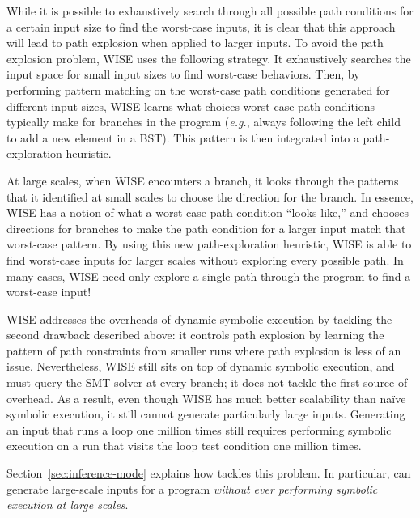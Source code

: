 While it is possible to exhaustively search through all possible path conditions for a certain input size to find the worst-case inputs, it is clear that this approach will lead
to path explosion when applied to larger inputs. To avoid the path explosion
problem, WISE uses the following strategy. It exhaustively searches the
input space for small input sizes to find worst-case behaviors. Then, by
performing pattern matching on the worst-case path conditions generated
for different input sizes, WISE learns what choices worst-case path conditions typically make for branches in the program ({\em e.g.}, always following the
left child to add a new element in a BST). This pattern is then integrated
into a path-exploration heuristic.

At large scales, when WISE encounters a branch, it looks through the
patterns that it identified at small scales to choose the direction for the
branch. In essence, WISE has a notion of what a worst-case path condition
``looks like,'' and chooses directions for branches to make the path condition
for a larger input match that worst-case pattern. By using this new
path-exploration heuristic, WISE is able to find worst-case inputs for larger
scales without exploring every possible path. In many cases, WISE need only
explore a single path through the program to find a worst-case input!

WISE addresses the overheads of dynamic symbolic execution by tackling the
second drawback described above: it controls path explosion by learning the
pattern of path constraints from smaller runs where path explosion is less of
an issue. Nevertheless, WISE still sits on top of dynamic symbolic execution,
and must query the SMT solver at every branch; it does not tackle the first
source of overhead. As a result, even though WISE has much better scalability
than na\"ive symbolic execution, it still cannot generate particularly large
inputs. Generating an input that runs a loop one million times still requires
performing symbolic execution on a run that visits the loop test condition one
million times.


Section~\ref{sec:inference-mode} explains how \lancet tackles this
problem. In particular, \lancet can generate large-scale inputs for a program
{\em without ever performing symbolic execution at large scales}.
